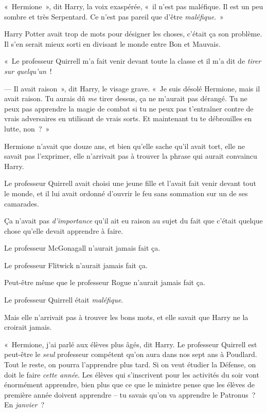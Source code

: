 «~Hermione~», dit Harry, la voix exaspérée, «~il n'est pas maléfique. Il est un peu sombre et très Serpentard. Ce n'est pas pareil que d'être \emph{maléfique}.~»

Harry Potter avait trop de mots pour désigner les choses, c'était ça son problème. Il s'en serait mieux sorti en divisant le monde entre Bon et Mauvais.

«~Le professeur Quirrell m'a fait venir devant toute la classe et il m'a dit de \emph{tirer sur quelqu'un}~!

--- Il avait raison~», dit Harry, le visage grave. «~Je suis désolé Hermione, mais il avait raison. Tu aurais dû \emph{me} tirer dessus, ça ne m'aurait pas dérangé. Tu ne peux pas apprendre la magie de combat si tu ne peux pas t'entraîner contre de vrais adversaires en utilisant de vrais sorts. Et maintenant tu te débrouilles en lutte, non~?~»

Hermione n'avait que douze ans, et bien qu'elle sache qu'il avait tort, elle ne savait pas l'exprimer, elle n'arrivait pas à trouver la phrase qui aurait convaincu Harry.

Le professeur Quirrell avait choisi une jeune fille et l'avait fait venir devant tout le monde, et il lui avait ordonné d'ouvrir le feu sans sommation sur un de ses camarades.

Ça n'avait pas \emph{d'importance} qu'il ait eu raison au sujet du fait que c'était quelque chose qu'elle devait apprendre à faire.

Le professeur McGonagall n'aurait jamais fait ça.

Le professeur Flitwick n'aurait jamais fait ça.

Peut-être même que le professeur Rogue n'aurait jamais fait ça.

Le professeur Quirrell était \emph{maléfique}.

Mais elle n'arrivait pas à trouver les bons mots, et elle savait que Harry ne la croirait jamais.

«~Hermione, j'ai parlé aux élèves plus âgés, dit Harry. Le professeur Quirrell est peut-être le \emph{seul} professeur compétent qu'on aura dans nos sept ans à Poudlard. Tout le reste, on pourra l'apprendre plus tard. Si on veut étudier la Défense, on doit le faire \emph{cette année}. Les élèves qui s'inscrivent pour les activités du soir vont énormément apprendre, bien plus que ce que le ministre pense que les élèves de première année doivent apprendre -- tu savais qu'on va apprendre le Patronus~? En \emph{janvier}~?

